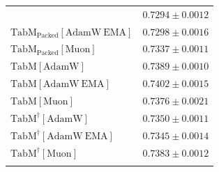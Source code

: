 \begin{longtable}{p{}p{}}
{\begin{tabular}{ll}
{\footnotesize $\mathrm{TabM_{\text{Packed}}[AdamW]}$ } & {\footnotesize$0.7294 \pm 0.0012$}\\ 
{\footnotesize $\mathrm{TabM_{\text{Packed}}[AdamW\ EMA]}$ } & {\footnotesize$0.7298 \pm 0.0016$}\\ 
{\footnotesize $\mathrm{TabM_{\text{Packed}}[Muon]}$ } & {\footnotesize$0.7337 \pm 0.0011$}\\ 
{\footnotesize $\mathrm{TabM[AdamW]}$ } & {\footnotesize$0.7389 \pm 0.0010$}\\ 
{\footnotesize $\mathrm{TabM[AdamW\ EMA]}$ } & {\footnotesize$0.7402 \pm 0.0015$}\\ 
{\footnotesize $\mathrm{TabM[Muon]}$ } & {\footnotesize$0.7376 \pm 0.0021$}\\ 
{\footnotesize $\mathrm{TabM^\dagger[AdamW]}$ } & {\footnotesize$0.7350 \pm 0.0011$}\\ 
{\footnotesize $\mathrm{TabM^\dagger[AdamW\ EMA]}$ } & {\footnotesize$0.7345 \pm 0.0014$}\\ 
{\footnotesize $\mathrm{TabM^\dagger[Muon]}$ } & {\footnotesize$0.7383 \pm 0.0012$}\\ 
\bottomrule
\end{tabular}}

&

\topalign{
\centering
\setlength\tabcolsep{2.5pt}
\renewcommand{\arraystretch}{0.8}
\begin{tabular}{ll}


\end{tabular}}
\end{longtable}
